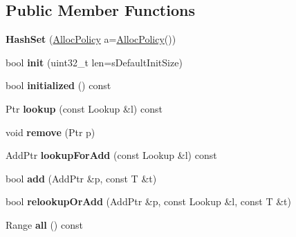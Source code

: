 \subsection*{Public Member Functions}
\begin{DoxyCompactItemize}
\item 
\hypertarget{classjs_1_1_hash_set_ab7de2c02a232efe1251293890d701b1e}{{\bfseries Hash\-Set} (\hyperlink{class_alloc_policy}{Alloc\-Policy} a=\hyperlink{class_alloc_policy}{Alloc\-Policy}())}\label{classjs_1_1_hash_set_ab7de2c02a232efe1251293890d701b1e}

\item 
\hypertarget{classjs_1_1_hash_set_aba80e6d44bc36f976720c90cf1be14f5}{bool {\bfseries init} (uint32\-\_\-t len=s\-Default\-Init\-Size)}\label{classjs_1_1_hash_set_aba80e6d44bc36f976720c90cf1be14f5}

\item 
\hypertarget{classjs_1_1_hash_set_a04e8b0ba843cd722987a83916d1d8773}{bool {\bfseries initialized} () const }\label{classjs_1_1_hash_set_a04e8b0ba843cd722987a83916d1d8773}

\item 
\hypertarget{classjs_1_1_hash_set_add2d2158166963f0a1fdee54bac62beb}{Ptr {\bfseries lookup} (const Lookup \&l) const }\label{classjs_1_1_hash_set_add2d2158166963f0a1fdee54bac62beb}

\item 
\hypertarget{classjs_1_1_hash_set_af1dd16e7f11f656e095da05481f2df86}{void {\bfseries remove} (Ptr p)}\label{classjs_1_1_hash_set_af1dd16e7f11f656e095da05481f2df86}

\item 
\hypertarget{classjs_1_1_hash_set_a22e1d1fad858bb5c03a0df4316a4d682}{Add\-Ptr {\bfseries lookup\-For\-Add} (const Lookup \&l) const }\label{classjs_1_1_hash_set_a22e1d1fad858bb5c03a0df4316a4d682}

\item 
\hypertarget{classjs_1_1_hash_set_a9cdd5913290af74fd2f2180c4b8fd7fd}{bool {\bfseries add} (Add\-Ptr \&p, const T \&t)}\label{classjs_1_1_hash_set_a9cdd5913290af74fd2f2180c4b8fd7fd}

\item 
\hypertarget{classjs_1_1_hash_set_a7ec3a0114dd982991a5dc92be39808d5}{bool {\bfseries relookup\-Or\-Add} (Add\-Ptr \&p, const Lookup \&l, const T \&t)}\label{classjs_1_1_hash_set_a7ec3a0114dd982991a5dc92be39808d5}

\item 
\hypertarget{classjs_1_1_hash_set_a92d53ab25ad2caa29319f2a236381b1e}{Range {\bfseries all} () const }\label{classjs_1_1_hash_set_a92d53ab25ad2caa29319f2a236381b1e}


\end{DoxyCompactItemize}
